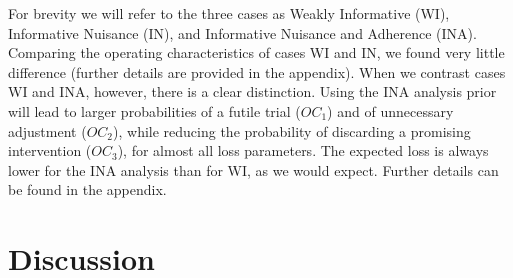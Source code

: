 \documentclass[AMA,STIX1COL]{WileyNJD-v2}
\begin{document}
For brevity we will refer to the three cases as Weakly Informative (WI), Informative Nuisance (IN), and Informative Nuisance and Adherence (INA). Comparing the operating characteristics of cases WI and IN, we found very little difference (further details are provided in the appendix). When we contrast cases WI and INA, however, there is a clear distinction. Using the INA analysis prior will lead to larger probabilities of a futile trial ($OC_1$) and of unnecessary adjustment ($OC_2$), while reducing the probability of discarding a promising intervention ($OC_3$), for almost all loss parameters. The expected loss is always lower for the INA analysis than for WI, as we would expect. Further details can be found in the appendix.



\section{Discussion}\label{sec:discussion}



\end{document}

